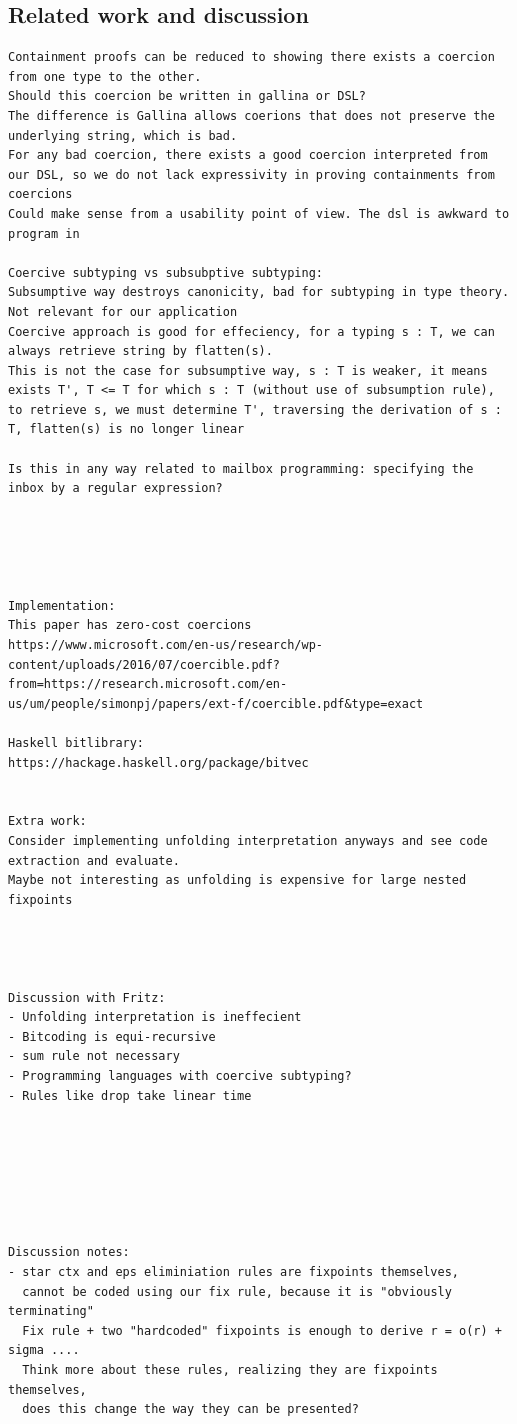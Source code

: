 \subsection{Related work and discussion}
\begin{verbatim}
Containment proofs can be reduced to showing there exists a coercion from one type to the other.
Should this coercion be written in gallina or DSL?
The difference is Gallina allows coerions that does not preserve the underlying string, which is bad.
For any bad coercion, there exists a good coercion interpreted from our DSL, so we do not lack expressivity in proving containments from coercions
Could make sense from a usability point of view. The dsl is awkward to program in

Coercive subtyping vs subsubptive subtyping:
Subsumptive way destroys canonicity, bad for subtyping in type theory. Not relevant for our application
Coercive approach is good for effeciency, for a typing s : T, we can always retrieve string by flatten(s). 
This is not the case for subsumptive way, s : T is weaker, it means exists T', T <= T for which s : T (without use of subsumption rule), to retrieve s, we must determine T', traversing the derivation of s : T, flatten(s) is no longer linear

Is this in any way related to mailbox programming: specifying the inbox by a regular expression?





Implementation:
This paper has zero-cost coercions
https://www.microsoft.com/en-us/research/wp-content/uploads/2016/07/coercible.pdf?from=https://research.microsoft.com/en-us/um/people/simonpj/papers/ext-f/coercible.pdf&type=exact

Haskell bitlibrary:
https://hackage.haskell.org/package/bitvec


Extra work:
Consider implementing unfolding interpretation anyways and see code extraction and evaluate.
Maybe not interesting as unfolding is expensive for large nested fixpoints




Discussion with Fritz:
- Unfolding interpretation is ineffecient
- Bitcoding is equi-recursive
- sum rule not necessary
- Programming languages with coercive subtyping?
- Rules like drop take linear time







Discussion notes:
- star ctx and eps eliminiation rules are fixpoints themselves,
  cannot be coded using our fix rule, because it is "obviously terminating"
  Fix rule + two "hardcoded" fixpoints is enough to derive r = o(r) + sigma ....
  Think more about these rules, realizing they are fixpoints themselves,
  does this change the way they can be presented?


\end{verbatim}
